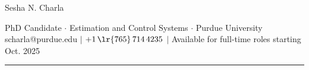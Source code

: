 \documentclass[letterpaper, 10pt]{article}
\begin{document}
\begin{center}
        \huge
        Sesha N. Charla
\end{center}
\begin{center}
        PhD Candidate $\cdot$
        Estimation and Control Systems $\cdot$
        Purdue University \\
        scharla@purdue.edu $|$
        $+1\,\lr{765}\, 714 \, 4235$ $|$
        Available for full-time roles starting Oct. 2025
\end{center}

\noindent\rule{\textwidth}{0.4pt}







\end{document}
